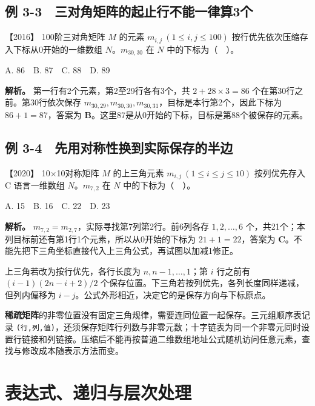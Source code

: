 \subsection{例 3-3　三对角矩阵的起止行不能一律算3个}\label{ds-ex3-3}

\noindent{}【2016】 100阶三对角矩阵 \(M\) 的元素 \(m_{i,j}\ (1\le i,j\le100)\) 按行优先依次压缩存入下标从0开始的一维数组 \(N\)。\(m_{30,30}\) 在 \(N\) 中的下标为（　）。

A. 86　B. 87　C. 88　D. 89


\textbf{解析。} 第一行有2个元素，第2至29行各有3个，共 \(2+28\times3=86\) 个在第30行之前。第30行依次保存 \(m_{30,29},m_{30,30},m_{30,31}\)，目标是本行第2个，因此下标为 \(86+1=87\)，答案为 \textbf{B}。这里87是从0开始的下标，目标是第88个被保存的元素。

\subsection{例 3-4　先用对称性换到实际保存的半边}\label{ds-ex3-4}

\noindent{}【2020】 10×10对称矩阵 \(M\) 的上三角元素 \(m_{i,j}\ (1\le i\le j\le10)\) 按列优先存入 C 语言一维数组 \(N\)。\(m_{7,2}\) 在 \(N\) 中的下标为（　）。

A. 15　B. 16　C. 22　D. 23


\textbf{解析。} \(m_{7,2}=m_{2,7}\)，实际寻找第7列第2行。前6列各存 \(1,2,\ldots,6\) 个，共21个；本列目标前还有第1行1个元素，所以从0开始的下标为 \(21+1=22\)，答案为 \textbf{C}。不能先把下三角坐标直接代入上三角公式，再试图以加减1修正。

上三角若改为按行优先，各行长度为 \(n,n-1,\ldots,1\)；第 \(i\) 行之前有 \((i-1)(2n-i+2)/2\) 个保存位置。下三角若按列优先，各列长度同样递减，但列内偏移为 \(i-j\)。公式外形相近，决定它的是保存方向与下标原点。

\textbf{稀疏矩阵}的非零位置没有固定三角规律，需要连同位置一起保存。三元组顺序表记录 \texttt{(行,}\allowbreak{}\texttt{列,}\allowbreak{}\texttt{值)}，还须保存矩阵行列数与非零元数；十字链表为同一个非零元同时设置行链接和列链接。压缩后不能再按普通二维数组地址公式随机访问任意元素，查找与修改成本随表示方法而变。

\section{表达式、递归与层次处理}\label{ds-03-07}

